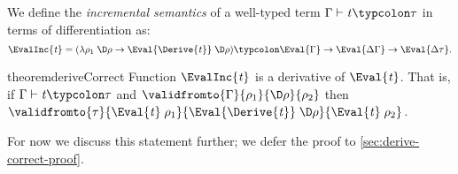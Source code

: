 \begin{definition}
  \label{def:inc-semantics}
  We define the \emph{incremental semantics} of a well-typed term
  \ensuremath{\Gamma\vdash\Varid{t}\typcolon\tau} in terms of differentiation as:
  \[\ensuremath{\EvalInc{\Varid{t}}\mathrel{=}(\lambda \rho_{1}\;\D\rho\to \Eval{\Derive{\Varid{t}}}\;\D\rho)\typcolon\Eval{\Gamma}\to \Eval{\Delta \Gamma}\to \Eval{\Delta \tau}}.\]
\end{definition}

\begin{restatable}{theorem}{deriveCorrect}
  \label{thm:derive-correct}
  Function \ensuremath{\EvalInc{\Varid{t}}} is a derivative of \ensuremath{\Eval{\Varid{t}}}. That is, if
  \ensuremath{\Gamma\vdash\Varid{t}\typcolon\tau} and \ensuremath{\validfromto{\Gamma}{\rho_{1}}{\D\rho}{\rho_{2}}} then
  \ensuremath{\validfromto{\tau}{\Eval{\Varid{t}}\;\rho_{1}}{\Eval{\Derive{\Varid{t}}}\;\D\rho}{\Eval{\Varid{t}}\;\rho_{2}}}.
\end{restatable}

For now we discuss this statement further; we defer the proof to
\cref{sec:derive-correct-proof}.

